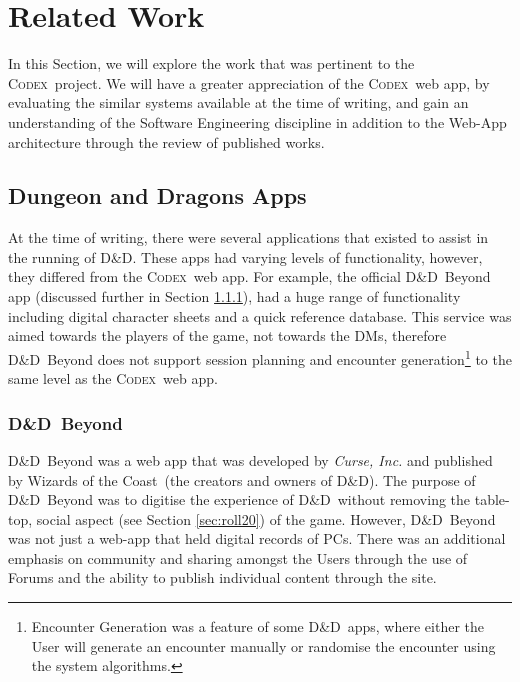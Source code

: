 \documentclass[final]{cmpreport}
\newcommand{\WotC}{Wizards of the Coast}
\newcommand{\dnd}{D\&D}
\newcommand{\Codex}{\textsc{Codex}}
\begin{document}
	\section{Related Work} \label{sec:related}
	In this Section, we will explore the work that was pertinent to the \Codex \ project. We will have a greater appreciation of the \Codex \ web app, by evaluating the similar systems available at the time of writing, and gain an understanding of the Software Engineering discipline in addition to the Web-App architecture through the review of published works.
	
		\subsection{Dungeon and Dragons Apps} \label{sec:other-dnd-apps}
		At the time of writing, there were several applications that existed to assist in the running of \dnd. These apps had varying levels of functionality, however, they differed from the \Codex \ web app. For example, the official \dnd \ Beyond app \citep{dnd-beyond} (discussed further in Section \ref{sec:dnd-beyond}), had a huge range of functionality including digital character sheets and a quick reference database. This service was aimed towards the players of the game, not towards the DMs, therefore \dnd \ Beyond does not support session planning and encounter generation\footnote{Encounter Generation was a feature of some \dnd \ apps, where either the User will generate an encounter manually or randomise the encounter using the system algorithms.} to the same level as the \Codex \ web app.
		
			\subsubsection{\dnd \ Beyond} \label{sec:dnd-beyond}
			\dnd \ Beyond was a web app that was developed by \emph{Curse, Inc.} and published by \WotC \ (the creators and owners of \dnd). The purpose of \dnd \ Beyond was to digitise the experience of \dnd \ without removing the table-top, social aspect (see Section \ref{sec:roll20}) of the game. However, \dnd \ Beyond was not just a web-app that held digital records of PCs. There was an additional emphasis on community and sharing amongst the Users through the use of Forums and the ability to publish individual content through the site. 
			
\end{document}
